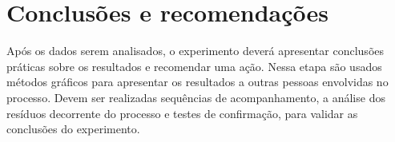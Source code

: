 \section{Conclusões e recomendações}
Após os dados serem analisados, o experimento deverá apresentar conclusões práticas sobre os resultados e recomendar uma ação. Nessa etapa são usados métodos gráficos para apresentar os resultados a outras pessoas envolvidas no processo. Devem ser realizadas sequências de acompanhamento, a análise dos resíduos decorrente do processo e testes de confirmação, para validar as conclusões do experimento. 

